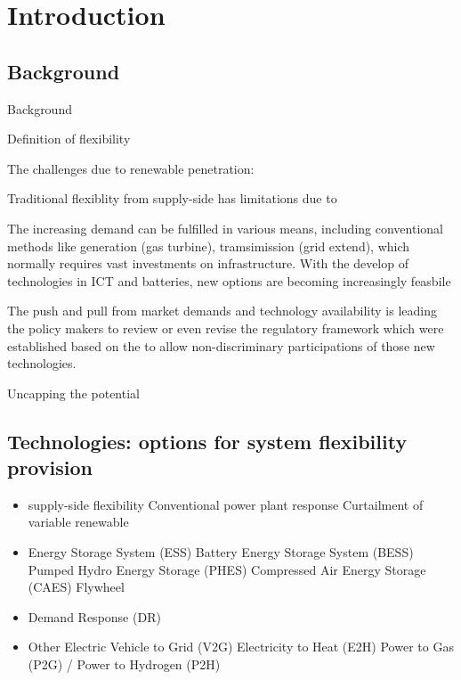 \chapter{Introduction}
\label{ch:introduction}
%
\section{Background}

Background

Definition of flexibility

The challenges due to renewable penetration:

Traditional flexiblity from supply-side has limitations due to %

The increasing demand can be fulfilled in various means, including conventional methods like generation (gas turbine), tramsimission (grid extend), which normally requires vast investments on infrastructure. With the develop of technologies in ICT and batteries, new options are becoming increasingly feasbile %

The push and pull from market demands and technology availability is leading the policy makers to review or even revise the regulatory framework which were established based on the  to allow non-discriminary participations of those new technologies. %

Uncapping the potential

\section{Technologies: options for system flexibility provision}

\begin{itemize}
	\item supply-side flexibility
	\subitem Conventional power plant response
	\subitem Curtailment of variable renewable
	\item Energy Storage System (ESS)
	\subitem Battery Energy Storage System (BESS)
	\subitem Pumped Hydro Energy Storage (PHES)
	\subitem Compressed Air Energy Storage (CAES)
	\subitem Flywheel
	\item Demand Response (DR)
	\item Other
	\subitem Electric Vehicle to Grid (V2G)
	\subitem Electricity to Heat (E2H)
	\subitem Power to Gas (P2G) / Power to Hydrogen (P2H)
\end{itemize}

